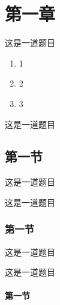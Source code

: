 \documentclass{xdyy-notes}
\begin{document}
\maketitle

\frontmatter

\begin{preface}
  \zhlipsum[1-3]
\end{preface}

\tableofcontents

\mainmatter

\chapter{第一章}
\begin{exercise}
  这是一道题目
  \begin{enumerate}
    \item 1
    \item 2
    \item 3
  \end{enumerate}
\end{exercise}

\begin{exercise}
  这是一道题目
\end{exercise}

\section{第一节}

\begin{exercise}
  这是一道题目
\end{exercise}

\begin{exercise}
  这是一道题目
\end{exercise}

\subsection{第一节}

\begin{exercise}
  这是一道题目
\end{exercise}

\begin{exercise}
  这是一道题目
\end{exercise}

\subsubsection{第一节}
\end{document}
